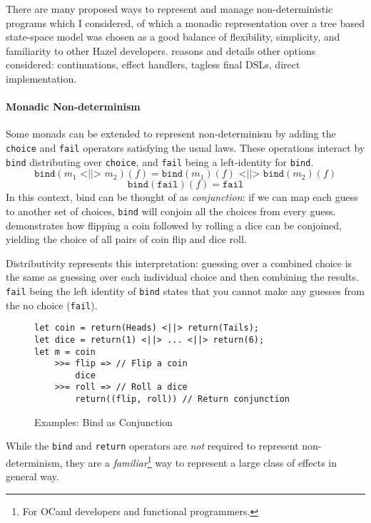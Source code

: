 There are many proposed ways to represent and manage non-deterministic programs which I considered, of which a monadic representation over a tree based state-space model was chosen as a good balance of flexibility, simplicity, and familiarity to other Hazel developers.  reasons and details other options considered: continuations, effect handlers, tagless final DSLs, direct implementation.  

\paragraph{Monadic Non-determinism} Some monads can be extended to represent non-determinism by adding the \texttt{choice} and \texttt{fail} operators satisfying the usual laws.
These operations interact by \texttt{bind} distributing over \texttt{choice}, and \texttt{fail} being a left-identity for \texttt{bind}.
\[\texttt{bind}(m_1 \texttt{ <||> } m_2)(f) = \texttt{bind}(m_1)(f) \texttt{ <||> } \texttt{bind}(m_2)(f)\]
\[\texttt{bind}(\texttt{fail})(f) = \texttt{fail}\]
In this context, bind can be thought of as \textit{conjunction}: if we can map each guess to another set of choices, \texttt{bind} will conjoin all the choices from every guess.  demonstrates how flipping a coin followed by rolling a dice can be conjoined, yielding the choice of all pairs of coin flip and dice roll.

Distributivity represents this interpretation:  guessing over a combined choice is the same as guessing over each individual choice and then combining the results. \texttt{fail} being the left identity of \texttt{bind} states that you cannot make any guesses from the no choice (\texttt{fail}). 
\begin{figure}[h]\centering
\begin{verbatim}
let coin = return(Heads) <||> return(Tails);
let dice = return(1) <||> ... <||> return(6);
let m = coin 
    >>= flip => // Flip a coin
        dice
    >>= roll => // Roll a dice
        return((flip, roll)) // Return conjunction
\end{verbatim}
\caption{Examples: Bind as Conjunction}
\label{fig:Conjunction}
\end{figure}

While the \texttt{bind} and \texttt{return} operators are \textit{not} required to represent non-determinism, they are a \textit{familiar}\footnote{For OCaml developers and functional programmers.} way to represent a large class of effects in general way. 


